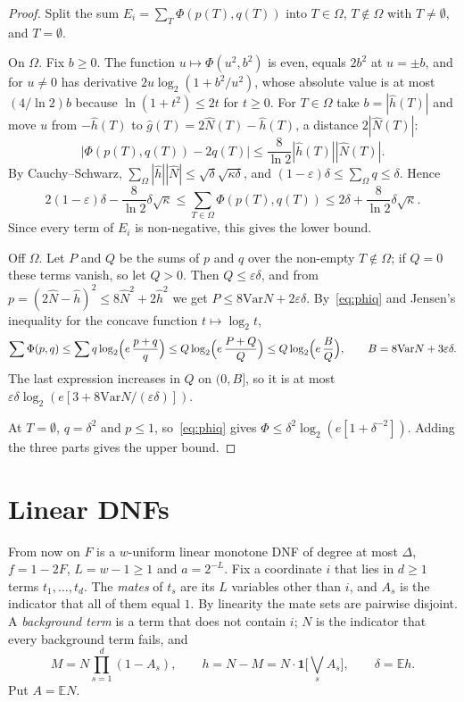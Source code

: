 \documentclass[11pt]{amsart}
\theoremstyle{remark}
\newcommand{\Var}{\mathrm{Var}}
\newcommand{\E}{\mathbb{E}}
\begin{document}
\begin{proof}
Split the sum $E_i=\sum_T\Phi(p(T),q(T))$ into $T\in\Omega$, $T\notin\Omega$ with $T\neq\emptyset$, and $T=\emptyset$.

On $\Omega$. Fix $b\ge0$. The function $u\mapsto\Phi(u^2,b^2)$ is even, equals $2b^2$ at $u=\pm b$, and for $u\neq0$ has
derivative $2u\log_2(1+b^2/u^2)$, whose absolute value is at most $(4/\ln2)b$ because $\ln(1+t^2)\le2t$ for $t\ge0$.
For $T\in\Omega$ take $b=|\hat h(T)|$ and move $u$ from $-\hat h(T)$ to $\hat g(T)=2\hat N(T)-\hat h(T)$, a distance
$2|\hat N(T)|$:
\[
\bigl|\Phi(p(T),q(T))-2q(T)\bigr|\le\frac{8}{\ln2}|\hat h(T)||\hat N(T)|.
\]
By Cauchy--Schwarz, $\sum_\Omega|\hat h||\hat N|\le\sqrt\delta\sqrt{\kappa\delta}$, and $(1-\varepsilon)\delta\le
\sum_\Omega q\le\delta$. Hence
\[
2(1-\varepsilon)\delta-\frac{8}{\ln2}\delta\sqrt\kappa\le\sum_{T\in\Omega}\Phi(p(T),q(T))\le
2\delta+\frac{8}{\ln2}\delta\sqrt\kappa.
\]
Since every term of $E_i$ is non-negative, this gives the lower bound.

Off $\Omega$. Let $P$ and $Q$ be the sums of $p$ and $q$ over the non-empty $T\notin\Omega$; if $Q=0$ these terms
vanish, so let $Q>0$. Then $Q\le\varepsilon\delta$,
and from $p=(2\hat N-\hat h)^2\le8\hat N^2+2\hat h^2$ we get $P\le8\Var N+2\varepsilon\delta$. By~\eqref{eq:phiq} and
Jensen's inequality for the concave function $t\mapsto\log_2t$,
\[
\sum\Phi(p,q)\le\sum q\log_2\Bigl(e\,\frac{p+q}{q}\Bigr)\le Q\log_2\Bigl(e\,\frac{P+Q}{Q}\Bigr)\le
Q\log_2\Bigl(e\,\frac{B}{Q}\Bigr),\qquad B=8\Var N+3\varepsilon\delta.
\]
The last expression increases in $Q$ on $(0,B]$, so it is at most
$\varepsilon\delta\log_2(e[3+8\Var N/(\varepsilon\delta)])$.

At $T=\emptyset$, $q=\delta^2$ and $p\le1$, so~\eqref{eq:phiq} gives $\Phi\le\delta^2\log_2(e[1+\delta^{-2}])$. Adding
the three parts gives the upper bound.
\end{proof}

\section{Linear DNFs}\label{sec:lin}

From now on $F$ is a $w$-uniform linear monotone DNF of degree at most $\Delta$, $f=1-2F$, $L=w-1\ge1$ and $a=2^{-L}$. Fix
a coordinate $i$ that lies in $d\ge1$ terms $t_1,\dots,t_d$. The \emph{mates} of $t_s$ are its $L$ variables other than
$i$, and $A_s$ is the indicator that all of them equal $1$. By linearity the mate sets are pairwise disjoint. A
\emph{background term} is a term that does not contain $i$; $N$ is the indicator that every background term fails, and
\[
M=N\prod_{s=1}^d(1-A_s),\qquad h=N-M=N\cdot\mathbf 1\bigl[\textstyle\bigvee_sA_s\bigr],\qquad \delta=\E h.
\]
Put $A=\E N$.
\end{document}
